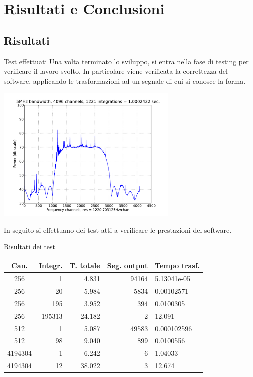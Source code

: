 \documentclass[red]{beamer}
\begin{document}
\section{Risultati e Conclusioni}
\subsection{Risultati}
\begin{frame}{Test effettuati}
	Una volta terminato lo sviluppo, si entra nella fase di testing per
	verificare il lavoro svolto. In particolare viene verificata la
	\alert{correttezza} del software, applicando le trasformazioni ad un segnale
	di cui si conosce la forma.
	\begin{center}
		\includegraphics[width=0.65\textwidth]{5_4096_1221}
	\end{center}\pause
	In seguito si effettuano dei test atti a verificare le \alert{prestazioni}
	del software.
\end{frame}
\begin{frame}{Risultati dei test}
	\begin{tabular}{crrrl}
Can. & Integr. & T. totale & Seg. output & Tempo trasf.
\\\hline
256 & 1 & 4.831 & 94164 & 5.13041e-05\\
256 & 20 & 5.984 & 5834 & 0.00102571\\
256 & 195 & 3.952 & 394 & 0.0100305\\
256 & 195313 & 24.182 & 2 & 12.091\\
512 & 1 & 5.087 & 49583 & 0.000102596\\
512 & 98 & 9.040 & 899 & 0.0100556\\
4194304 & 1 & 6.242 & 6 & 1.04033\\
4194304 & 12 & 38.022 & 3 & 12.674\\
\end{tabular}
\end{frame}
\end{document}
